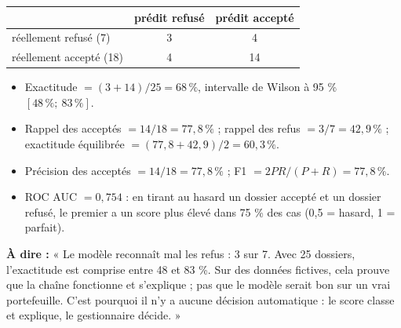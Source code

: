 \documentclass[11pt,a4paper]{article}
\begin{document}
\begin{center}
\begin{tabular}{lcc}
\toprule
 & prédit refusé & prédit accepté \\
\midrule
réellement refusé (7) & 3 & 4 \\
réellement accepté (18) & 4 & 14 \\
\bottomrule
\end{tabular}
\end{center}
\begin{itemize}
\item Exactitude $=(3+14)/25 = 68\,\%$, intervalle de Wilson à 95 \% $[48\,\% ;\ 83\,\%]$.
\item Rappel des acceptés $=14/18=77{,}8\,\%$ ; rappel des refus $=3/7=42{,}9\,\%$ ;
exactitude équilibrée $=(77{,}8+42{,}9)/2 = 60{,}3\,\%$.
\item Précision des acceptés $=14/18=77{,}8\,\%$ ; F1 $=2PR/(P+R)=77{,}8\,\%$.
\item ROC AUC $=0{,}754$ : en tirant au hasard un dossier accepté et un dossier refusé, le premier a
un score plus élevé dans 75 \% des cas (0,5 = hasard, 1 = parfait).
\end{itemize}
\textbf{À dire :} « Le modèle reconnaît mal les refus : 3 sur 7. Avec 25 dossiers, l'exactitude est
comprise entre 48 et 83 \%. Sur des données fictives, cela prouve que la chaîne fonctionne et
s'explique ; pas que le modèle serait bon sur un vrai portefeuille. C'est pourquoi il n'y a aucune
décision automatique : le score classe et explique, le gestionnaire décide. »
\end{document}
